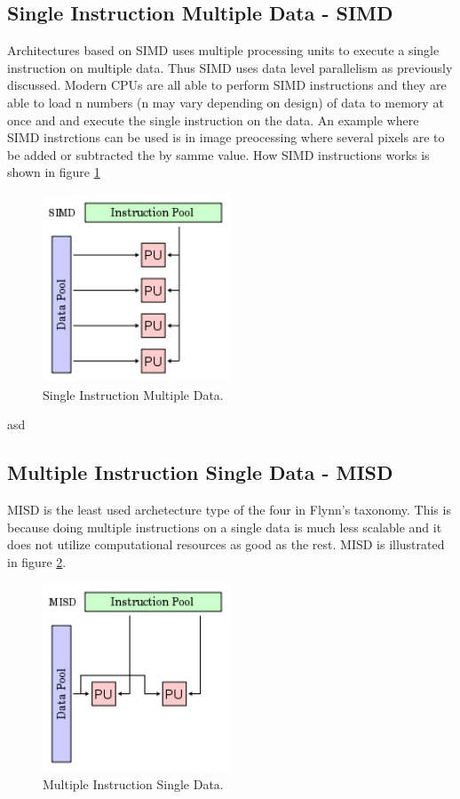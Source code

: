 \subsection*{Single Instruction Multiple Data - SIMD}
Architectures based on SIMD uses  multiple processing units to execute a single instruction on multiple data. Thus SIMD uses data level parallelism as previously discussed. Modern CPUs are all able to perform SIMD instructions and they are able to load n numbers (n may vary depending on design) of data to memory at once and and execute the single instruction on the data. An example where SIMD instrctions can be used is in image preocessing where several pixels are to be added or subtracted the by samme value. How SIMD instructions works is shown in figure \ref{SIMD}
\begin{figure}[h!]
\centering
\includegraphics[width=0.50\textwidth]{parallel/SIMD}
\caption{Single Instruction Multiple Data.}
\label{SIMD}
\end{figure}
asd
\subsection*{Multiple Instruction Single Data - MISD}
MISD is the least used archetecture type of the four in Flynn's taxonomy. This is because doing multiple instructions on a single data is much less scalable and it does not utilize computational resources as good as the rest. MISD is illustrated in figure \ref{MISD}.
\begin{figure}[h!]
\centering
\includegraphics[width=0.50\textwidth]{parallel/MISD}
\caption{Multiple Instruction Single Data.}
\label{MISD}
\end{figure}

